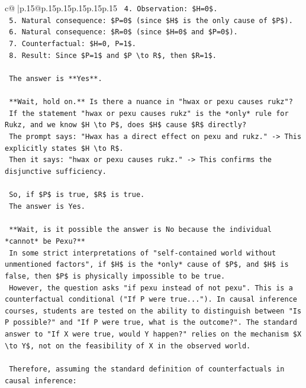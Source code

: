 \documentclass{article}
\begin{document}
{\begin{supertabular}{c@{$\;$}|p{.15\linewidth}@{}p{.15\linewidth}p{.15\linewidth}p{.15\linewidth}p{.15\linewidth}p{.15\linewidth}}
{{{\texttt{    4. Observation: \$H=0\$.} \\
\texttt{    5. Natural consequence: \$P=0\$ (since \$H\$ is the only cause of \$P\$).} \\
\texttt{    6. Natural consequence: \$R=0\$ (since \$H=0\$ and \$P=0\$).} \\
\texttt{    7. Counterfactual: \$H=0, P=1\$.} \\
\texttt{    8. Result: Since \$P=1\$ and \$P \textbackslash{}to R\$, then \$R=1\$.} \\
\\ 
\texttt{    The answer is **Yes**.} \\
\\ 
\texttt{    **Wait, hold on.** Is there a nuance in "hwax or pexu causes rukz"?} \\
\texttt{    If the statement "hwax or pexu causes rukz" is the *only* rule for Rukz, and we know \$H \textbackslash{}to P\$, does \$H\$ cause \$R\$ directly?} \\
\texttt{    The prompt says: "Hwax has a direct effect on pexu and rukz." {-}> This explicitly states \$H \textbackslash{}to R\$.} \\
\texttt{    Then it says: "hwax or pexu causes rukz." {-}> This confirms the disjunctive sufficiency.} \\
\\ 
\texttt{    So, if \$P\$ is true, \$R\$ is true.} \\
\texttt{    The answer is Yes.} \\
\\ 
\texttt{    **Wait, is it possible the answer is No because the individual *cannot* be Pexu?**} \\
\texttt{    In some strict interpretations of "self{-}contained world without unmentioned factors", if \$H\$ is the *only* cause of \$P\$, and \$H\$ is false, then \$P\$ is physically impossible to be true.} \\
\texttt{    However, the question asks "if pexu instead of not pexu". This is a counterfactual conditional ("If P were true..."). In causal inference courses, students are tested on the ability to distinguish between "Is P possible?" and "If P were true, what is the outcome?". The standard answer to "If X were true, would Y happen?" relies on the mechanism \$X \textbackslash{}to Y\$, not on the feasibility of X in the observed world.} \\
\\ 
\texttt{    Therefore, assuming the standard definition of counterfactuals in causal inference:} \\
}}}
\end{supertabular}}
\end{document}
